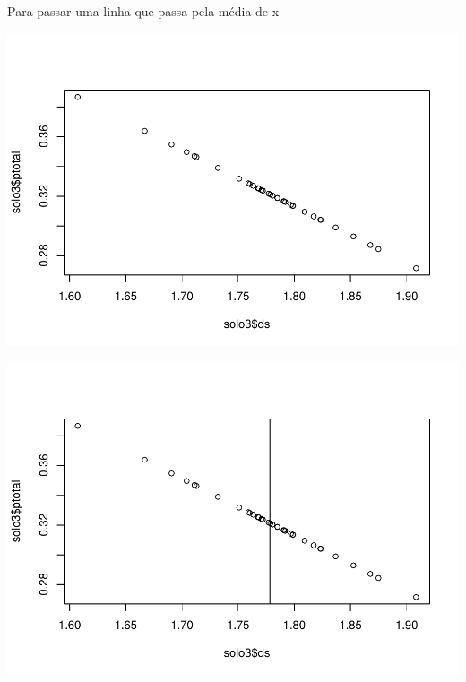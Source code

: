 \documentclass[]{book}
\newenvironment{Shaded}{\begin{snugshade}}{\end{snugshade}}
\newcommand{\CommentTok}[1]{\textcolor[rgb]{0.56,0.35,0.01}{\textit{#1}}}
\newcommand{\DataTypeTok}[1]{\textcolor[rgb]{0.13,0.29,0.53}{#1}}
\newcommand{\KeywordTok}[1]{\textcolor[rgb]{0.13,0.29,0.53}{\textbf{#1}}}
\newcommand{\NormalTok}[1]{#1}
\newcommand{\OperatorTok}[1]{\textcolor[rgb]{0.81,0.36,0.00}{\textbf{#1}}}
\begin{document}
Para passar uma linha que passa pela média de x

\begin{Shaded}
\end{Shaded}

\includegraphics{TudodoR_files/figure-latex/unnamed-chunk-161-1.pdf}

\begin{Shaded}
\end{Shaded}

\includegraphics{TudodoR_files/figure-latex/unnamed-chunk-162-1.pdf}
\end{document}
